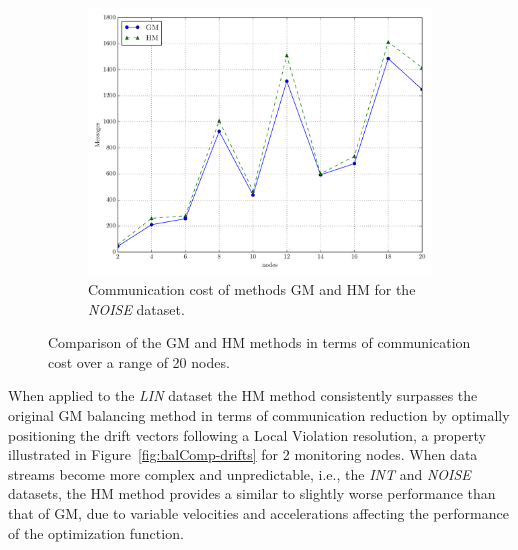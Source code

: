 \begin{figure}[!htb]
\begin{subfigure}{0.32\textwidth}%
  \includegraphics[width=\linewidth]{img/bal_msg_noisyinterweaving_nodes.pdf}
  \caption{Communication cost of methods GM and HM for the \emph{NOISE} dataset.}
\end{subfigure}
\vspace{0.5cm}
\caption{Comparison of the GM and HM methods in terms of communication cost over a range of 20 nodes.} \label{fig:balComp-msgs}
\end{figure}

When applied to the \emph{LIN} dataset the HM method consistently surpasses the original GM balancing method in terms of communication reduction by optimally positioning the drift vectors following a Local Violation resolution, a property illustrated in Figure~\ref{fig:balComp-drifts} for 2 monitoring nodes. When data streams become more complex and unpredictable, i.e., the \emph{INT} and \emph{NOISE} datasets, the HM method provides a similar to slightly worse performance than that of GM, due to variable velocities and accelerations affecting the performance of the optimization function.

